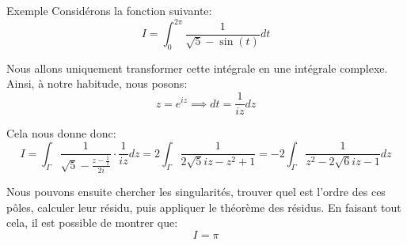 \documentclass[a4paper]{article}
\begin{document}
\begin{parag}{Exemple}
    Considérons la fonction suivante: 
    \[I = \int_{0}^{2\pi} \frac{1}{\sqrt{5} - \sin\left(t\right)} dt\]
    
    Nous allons uniquement transformer cette intégrale en une intégrale complexe. Ainsi, à notre habitude, nous posons: 
    \[z = e^{iz} \implies dt = \frac{1}{iz}dz\]
    
    Cela nous donne donc: 
    \[I = \int_{\Gamma} \frac{1}{\sqrt{5} - \frac{z - \frac{1}{z}}{2i}} \cdot  \frac{1}{iz} dz = 2 \int_{\Gamma} \frac{1}{2 \sqrt{5} i z - z^2 + 1} = -2 \int_{\Gamma} \frac{1}{z^2 - 2\sqrt{6} i z - 1} dz\]

    Nous pouvons ensuite chercher les singularités, trouver quel est l'ordre des ces pôles, calculer leur résidu, puis appliquer le théorème des résidus. En faisant tout cela, il est possible de montrer que: 
    \[I = \pi\]
\end{parag}
\end{document}
